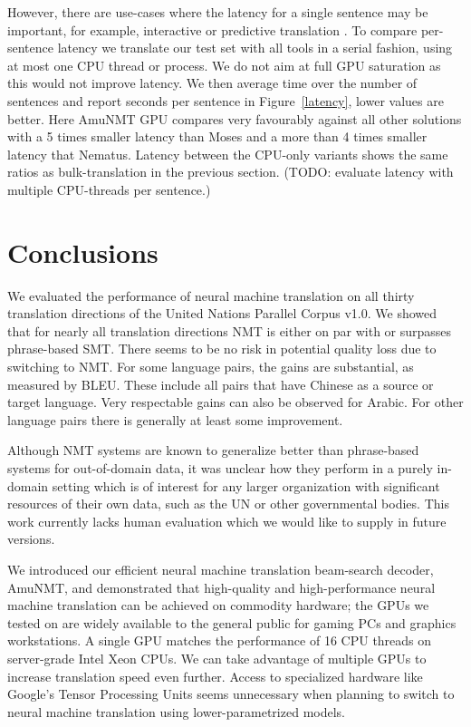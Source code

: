 \documentclass[11pt]{article}
\begin{document}
However, there are use-cases where the latency for a single sentence may be important, for example, interactive or predictive translation \cite{Knowles}. %
To compare per-sentence latency we translate our test set with all tools in a serial fashion, using at most one CPU thread or process. We do not aim at full GPU saturation as this would not improve latency. We then average time over the number of sentences and report seconds per sentence in Figure~\ref{latency}, lower values are better. Here AmuNMT GPU compares very favourably against all other solutions with a 5 times smaller latency than Moses and a more than 4 times smaller latency that Nematus. Latency between the CPU-only variants shows the same ratios as bulk-translation in the previous section. (TODO: evaluate latency with multiple CPU-threads per sentence.)

\section{Conclusions}

We evaluated the performance of neural machine translation on all thirty translation directions of the United Nations Parallel Corpus v1.0. We showed that for nearly all translation directions NMT is either on par with or surpasses phrase-based SMT. There seems to be no risk in potential quality loss due to switching to NMT. For some language pairs, the gains are substantial, as measured by BLEU. These include all pairs that have Chinese as a source or target language. Very respectable gains can also be observed for Arabic. For other language pairs there is generally at least some improvement. 

Although NMT systems are known to generalize better than phrase-based systems for out-of-domain data, it was unclear how they perform in a purely in-domain setting which is of interest for any larger organization with significant resources of their own data, such as the UN or other governmental bodies. This work currently lacks human evaluation which we would like to supply in future versions. 

We introduced our efficient neural machine translation beam-search decoder, AmuNMT, and demonstrated that high-quality and high-performance neural machine translation can be achieved on commodity hardware; the GPUs we tested on are widely available to the general public for gaming PCs and graphics workstations. A single GPU matches the performance of 16 CPU threads on server-grade Intel Xeon CPUs. We can take advantage of multiple GPUs to increase translation speed even further. Access to specialized hardware like Google's Tensor Processing Units seems unnecessary when planning to switch to neural machine translation using lower-parametrized models. 
\end{document}
